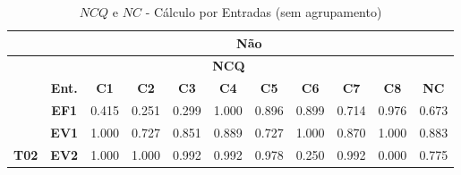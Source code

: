 \begin{table}[htbp]
	\centering
	\caption{$NCQ$ e $NC$ - Cálculo por Entradas (sem agrupamento)}
	\begin{tabular}{|cclllllllll|}
		\hline
		\rowcolor[HTML]{D0CECE} 
		\multicolumn{1}{|c|}{\cellcolor[HTML]{F2F2F2}\textbf{Agrupamento}} & \multicolumn{10}{c|}{Não} \\ \hline
		\rowcolor[HTML]{D0CECE} 
		\multicolumn{1}{|c|}{\cellcolor[HTML]{D0CECE}} & \multicolumn{9}{c|}{\cellcolor[HTML]{D0CECE}\textbf{NCQ}} & \multicolumn{1}{c|}{\cellcolor[HTML]{D0CECE}} \\ \cline{2-10}
		\rowcolor[HTML]{D0CECE} 
		\multicolumn{1}{|c|}{\multirow{-2}{*}{\cellcolor[HTML]{D0CECE}\textbf{Participante}}} & \multicolumn{1}{c|}{\cellcolor[HTML]{D0CECE}\textbf{Ent.}} & \multicolumn{1}{c|}{\cellcolor[HTML]{D0CECE}\textbf{C1}} & \multicolumn{1}{c|}{\cellcolor[HTML]{D0CECE}\textbf{C2}} & \multicolumn{1}{c|}{\cellcolor[HTML]{D0CECE}\textbf{C3}} & \multicolumn{1}{c|}{\cellcolor[HTML]{D0CECE}\textbf{C4}} & \multicolumn{1}{c|}{\cellcolor[HTML]{D0CECE}\textbf{C5}} & \multicolumn{1}{c|}{\cellcolor[HTML]{D0CECE}\textbf{C6}} & \multicolumn{1}{c|}{\cellcolor[HTML]{D0CECE}\textbf{C7}} & \multicolumn{1}{c|}{\cellcolor[HTML]{D0CECE}\textbf{C8}} & \multicolumn{1}{c|}{\multirow{-2}{*}{\cellcolor[HTML]{D0CECE}\textbf{NC}}} \\ \hline
		\multicolumn{1}{|c|}{\cellcolor[HTML]{F2F2F2}} & \multicolumn{1}{c|}{\textbf{EF1}} & \multicolumn{1}{l|}{0.415} & \multicolumn{1}{l|}{0.251} & \multicolumn{1}{l|}{0.299} & \multicolumn{1}{l|}{1.000} & \multicolumn{1}{l|}{0.896} & \multicolumn{1}{l|}{0.899} & \multicolumn{1}{l|}{0.714} & \multicolumn{1}{l|}{0.976} & 0.673 \\ \cline{2-11} 
		\rowcolor[HTML]{F2F2F2} 
		\multicolumn{1}{|c|}{\cellcolor[HTML]{F2F2F2}} & \multicolumn{1}{c|}{\cellcolor[HTML]{F2F2F2}\textbf{EV1}} & \multicolumn{1}{l|}{\cellcolor[HTML]{F2F2F2}1.000} & \multicolumn{1}{l|}{\cellcolor[HTML]{F2F2F2}0.727} & \multicolumn{1}{l|}{\cellcolor[HTML]{F2F2F2}0.851} & \multicolumn{1}{l|}{\cellcolor[HTML]{F2F2F2}0.889} & \multicolumn{1}{l|}{\cellcolor[HTML]{F2F2F2}0.727} & \multicolumn{1}{l|}{\cellcolor[HTML]{F2F2F2}1.000} & \multicolumn{1}{l|}{\cellcolor[HTML]{F2F2F2}0.870} & \multicolumn{1}{l|}{\cellcolor[HTML]{F2F2F2}1.000} & 0.883 \\ \cline{2-11} 
		\multicolumn{1}{|c|}{\multirow{-3}{*}{\cellcolor[HTML]{F2F2F2}\textbf{T02}}} & \multicolumn{1}{c|}{\textbf{EV2}} & \multicolumn{1}{l|}{1.000} & \multicolumn{1}{l|}{1.000} & \multicolumn{1}{l|}{0.992} & \multicolumn{1}{l|}{0.992} & \multicolumn{1}{l|}{0.978} & \multicolumn{1}{l|}{0.250} & \multicolumn{1}{l|}{0.992} & \multicolumn{1}{l|}{0.000} & 0.775 \\ \hline

\end{tabular}
\end{table}
